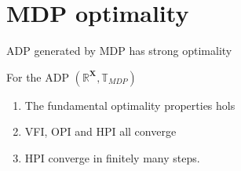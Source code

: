\section{MDP optimality}

\begin{frame}{ADP generated by MDP has strong optimality}
    \begin{theorem}
        For the ADP $(\mathbb{R}^{\mathbf{X}}, \mathbb{T}_{MDP})$ 
        \begin{enumerate}
            \item The fundamental optimality properties hols
            \item VFI, OPI and HPI all converge
            \item HPI converge in finitely many steps. 
        \end{enumerate}
    \end{theorem}
\end{frame}